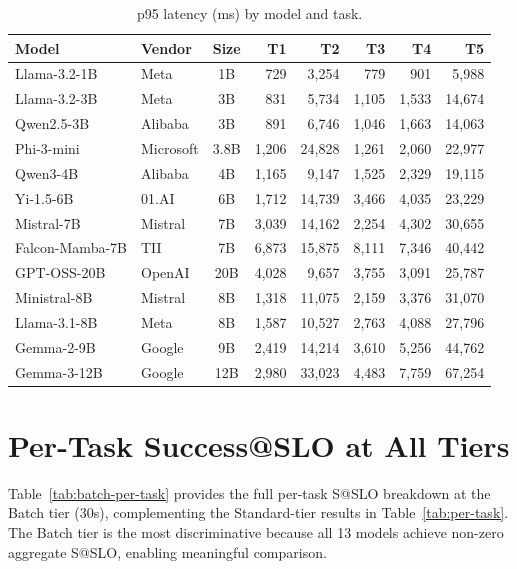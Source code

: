 \documentclass[11pt]{article}
\begin{document}
\begin{table}[h]
\centering
\caption{p95 latency (ms) by model and task.}
\label{tab:p95-detail}
\small
\begin{tabular}{llc rrrrr}
\toprule
\textbf{Model} & \textbf{Vendor} & \textbf{Size} & \textbf{T1} & \textbf{T2} & \textbf{T3} & \textbf{T4} & \textbf{T5} \\
\midrule
Llama-3.2-1B     & Meta      & 1B   & 729  & 3{,}254 & 779   & 901   & 5{,}988 \\
Llama-3.2-3B     & Meta      & 3B   & 831  & 5{,}734 & 1{,}105 & 1{,}533 & 14{,}674 \\
Qwen2.5-3B       & Alibaba   & 3B   & 891  & 6{,}746 & 1{,}046 & 1{,}663 & 14{,}063 \\
Phi-3-mini        & Microsoft & 3.8B & 1{,}206 & 24{,}828 & 1{,}261 & 2{,}060 & 22{,}977 \\
Qwen3-4B          & Alibaba   & 4B   & 1{,}165 & 9{,}147 & 1{,}525 & 2{,}329 & 19{,}115 \\
Yi-1.5-6B         & 01.AI     & 6B   & 1{,}712 & 14{,}739 & 3{,}466 & 4{,}035 & 23{,}229 \\
Mistral-7B        & Mistral   & 7B   & 3{,}039 & 14{,}162 & 2{,}254 & 4{,}302 & 30{,}655 \\
Falcon-Mamba-7B   & TII       & 7B   & 6{,}873 & 15{,}875 & 8{,}111 & 7{,}346 & 40{,}442 \\
GPT-OSS-20B       & OpenAI    & 20B  & 4{,}028 & 9{,}657 & 3{,}755 & 3{,}091 & 25{,}787 \\
Ministral-8B      & Mistral   & 8B   & 1{,}318 & 11{,}075 & 2{,}159 & 3{,}376 & 31{,}070 \\
Llama-3.1-8B      & Meta      & 8B   & 1{,}587 & 10{,}527 & 2{,}763 & 4{,}088 & 27{,}796 \\
Gemma-2-9B        & Google    & 9B   & 2{,}419 & 14{,}214 & 3{,}610 & 5{,}256 & 44{,}762 \\
Gemma-3-12B       & Google    & 12B  & 2{,}980 & 33{,}023 & 4{,}483 & 7{,}759 & 67{,}254 \\
\bottomrule
\end{tabular}
\end{table}

\section{Per-Task Success@SLO at All Tiers}
\label{app:per-task-all}

Table~\ref{tab:batch-per-task} provides the full per-task S@SLO breakdown at the Batch tier (30s), complementing the Standard-tier results in Table~\ref{tab:per-task}.  The Batch tier is the most discriminative because all 13 models achieve non-zero aggregate S@SLO, enabling meaningful comparison.
\end{document}

